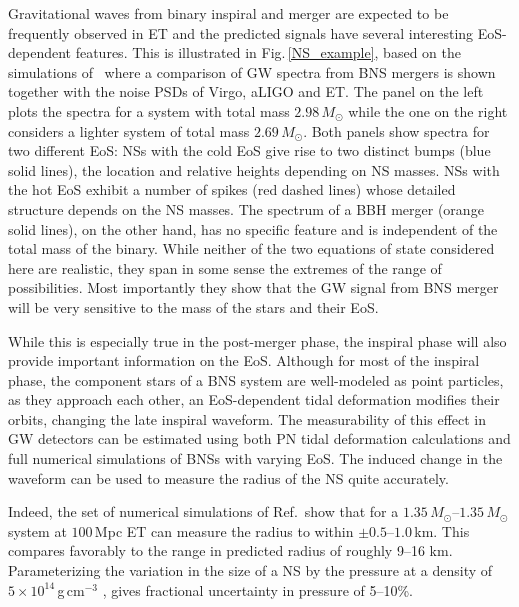 Gravitational waves from binary inspiral and merger are
expected to be frequently observed in ET and the predicted signals have
several interesting EoS-dependent features.
This is illustrated in Fig.\,\ref{NS_example}, based on the simulations
of~\cite{Baiotti08} where a comparison of GW spectra from
BNS mergers is shown together with the noise PSDs of 
Virgo, aLIGO and ET. The panel on the left plots the spectra for 
a system with total mass $2.98\,M_\odot$ while the one on
the right considers a lighter system of total mass $2.69\,M_\odot.$
Both panels show spectra for two different EoS: NSs with the cold EoS 
give rise to two distinct bumps (blue solid lines), the location
and relative heights depending on NS masses. NSs with
the hot EoS exhibit a number of spikes (red dashed lines)
whose detailed structure depends on the NS masses.  
The spectrum of a BBH merger (orange solid lines), on the other 
hand, has no specific feature and is independent of the total
mass of the binary.  While neither of the two equations of state 
considered here are realistic, they span in some sense the extremes 
of the range of possibilities.  Most importantly they show that the 
GW signal from BNS merger will be very sensitive to the mass of 
the stars and their EoS.

While this is especially true in the post-merger phase, the
inspiral phase will also provide important information on the EoS. 
Although for most of the inspiral phase, the component stars of 
a BNS system are well-modeled as point particles, as they approach 
each other, an EoS-dependent tidal deformation modifies their orbits,
changing the late inspiral waveform. The measurability of this effect
in GW detectors can be estimated using both
PN tidal deformation calculations and full numerical
simulations of BNSs with varying EoS. The induced change in the
waveform can be used to measure the radius of the NS quite accurately.

Indeed, the set of numerical simulations of Ref.\,\cite{Read:2009bns} 
show that for a $1.35\, M_{\odot}$--$1.35\, M_{\odot}$
system at $100$\,Mpc ET can measure the radius to within
$\pm 0.5$--$1.0$\,km.  This compares favorably to the range in
predicted radius of roughly 9--16 km.  Parameterizing the variation in
the size of a NS by the pressure at a density of $5\times10^{14}$\,g\,cm$^{-3}$
\cite{Read:2008pp}, gives fractional uncertainty in pressure of 5--10\%.  


